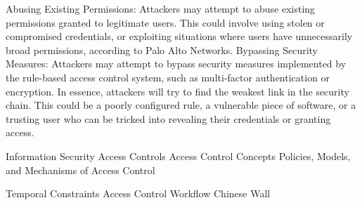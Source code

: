 Abusing Existing Permissions:
Attackers may attempt to abuse existing permissions granted to legitimate users. This could involve using stolen or compromised credentials, or exploiting situations where users have unnecessarily broad permissions, according to Palo Alto Networks. 
Bypassing Security Measures:
Attackers may attempt to bypass security measures implemented by the rule-based access control system, such as multi-factor authentication or encryption. 
In essence, attackers will try to find the weakest link in the security chain. This could be a poorly configured rule, a vulnerable piece of software, or a trusting user who can be tricked into revealing their credentials or granting access. 




 
 

 


Information Security Access Controls
Access Control Concepts
Policies, Models, and Mechanisms of Access Control

Temporal Constraints
Access Control Workflow
Chinese Wall
